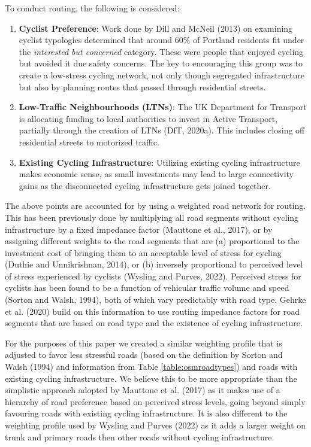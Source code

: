 \documentclass[
]{article}
\providecommand{\tightlist}{%
  \setlength{\itemsep}{0pt}\setlength{\parskip}{0pt}}
\begin{document}
To conduct routing, the following is considered:

\begin{enumerate}
\def\labelenumi{\arabic{enumi}.}
\tightlist
\item
  \textbf{Cyclist Preference}: Work done by Dill and McNeil (2013) on examining cyclist typologies determined that around 60\% of Portland residents fit under the \emph{interested but concerned} category. These were people that enjoyed cycling but avoided it due safety concerns. The key to encouraging this group was to create a low-stress cycling network, not only though segregated infrastructure but also by planning routes that passed through residential streets.
\item
  \textbf{Low-Traffic Neighbourhoods (LTNs)}: The UK Department for Transport is allocating funding to local authorities to invest in Active Transport, partially through the creation of LTNs (DfT, 2020a). This includes closing off residential streets to motorized traffic.
\item
  \textbf{Existing Cycling Infrastructure}: Utilizing existing cycling infrastructure makes economic sense, as small investments may lead to large connectivity gains as the disconnected cycling infrastructure gets joined together.
\end{enumerate}

The above points are accounted for by using a weighted road network for routing.
This has been previously done by multiplying all road segments without cycling infrastructure by a fixed impedance factor (Mauttone et al., 2017), or by assigning different weights to the road segments that are (a) proportional to the investment cost of bringing them to an acceptable level of stress for cycling (Duthie and Unnikrishnan, 2014), or (b) inversely proportional to perceived level of stress experienced by cyclists (Wysling and Purves, 2022).
Perceived stress for cyclists has been found to be a function of vehicular traffic volume and speed (Sorton and Walsh, 1994), both of which vary predictably with road type.
Gehrke et al. (2020) build on this information to use routing impedance factors for road segments that are based on road type and the existence of cycling infrastructure.

For the purposes of this paper we created a similar weighting profile that is adjusted to favor less stressful roads (based on the definition by Sorton and Walsh (1994) and information from Table \ref{table:osmroadtypes}) and roads with existing cycling infrastructure.
We believe this to be more appropriate than the simplistic approach adopted by Mauttone et al. (2017) as it makes use of a hierarchy of road preference based on perceived stress levels, going beyond simply favouring roads with existing cycling infrastructure.
It is also different to the weighting profile used by Wysling and Purves (2022) as it adds a larger weight on trunk and primary roads then other roads without cycling infrastructure.
\end{document}
